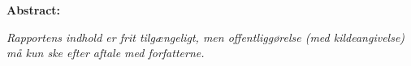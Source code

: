 \hfill
\begin{minipage}[t]{0.483\textwidth}
\textbf{Abstract:} \\[5pt]
\fbox{\parbox{7.5cm}{\bigskip\bigskip}}
\end{minipage}

\vfill

{\footnotesize\itshape Rapportens indhold er frit tilgængeligt, men offentliggørelse (med kildeangivelse) må kun ske efter aftale med forfatterne.}

